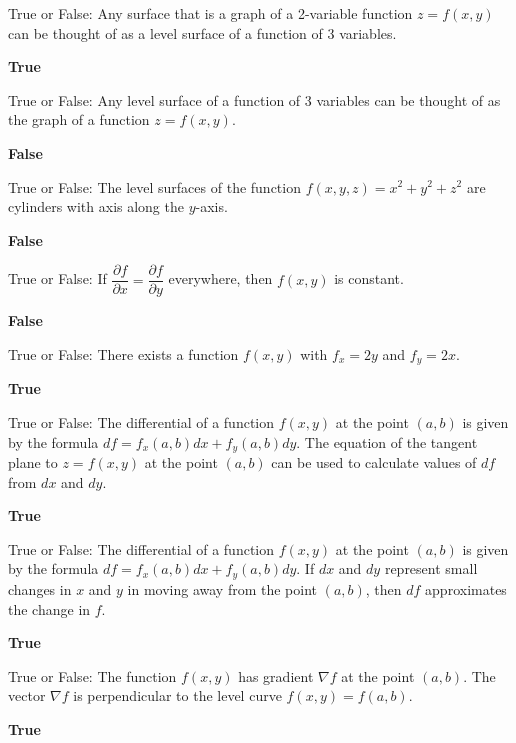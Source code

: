\documentclass{exam}
\newcommand{\pdev}[2]{\dfrac{\partial {#1}}{\partial{#2}}}
\begin{document}
\begin{questions}
		\question True or False: Any surface that is a graph of a 2-variable function $z=f(x,y)$ can be thought of as a	level surface of a function of 3 variables.
		 \begin{solution}
		 	\textbf{True}
		 \end{solution}
		
		\question True or False: Any level surface of a function of 3 variables can be thought of as the graph of a	function $z=f(x,y)$.
		 \begin{solution}
		 	\textbf{False}
		 \end{solution}
		
		\question True or False: The level surfaces of the function $f(x, y, z) = x^2 +y^2 +z^2$ are cylinders with axis along the $y$-axis.
		 \begin{solution}
		 	\textbf{False}
		 \end{solution}
		
		\question True or False: If $\pdev{f}{x}=\pdev{f}{y}$ everywhere, then $f(x, y)$ is constant.
		 \begin{solution}
		 	\textbf{False}
		 \end{solution}
		
		\question True or False: There exists a function $f(x, y)$ with $f_x = 2y$ and $f_y = 2x$.
		 \begin{solution}
		 	\textbf{True}
		 \end{solution}
		
		\question True or False: The differential of a function $f(x, y)$ at the point $(a, b)$ is given by the formula $df = f_x(a, b)dx + f_y(a, b)dy$. The equation of the tangent plane to $z=f(x,y)$ at the point
		$(a, b)$ can be used to calculate values of $df$ from $dx$ and $dy$.
		 \begin{solution}
		 	\textbf{True}
		 \end{solution}
		
		\question True or False: The differential of a function $f(x, y)$ at the point $(a, b)$ is given by the formula $df =f_x(a, b)dx+f_y(a, b)dy$. If $dx$ and $dy$ represent small changes in $x$ and $y$ in moving away from the point $(a, b)$, then $df$ approximates the change in $f$.
		 \begin{solution}
		 	\textbf{True}
		 \end{solution}
		
		\question True or False: The function $f(x, y)$ has gradient $\nabla f$ at the point $(a, b)$. The vector $\nabla f$ is perpendicular to the level curve $f(x, y) = f(a, b)$.
		 \begin{solution}
		 	\textbf{True}
		 \end{solution}
		

\end{questions}
\end{document}
